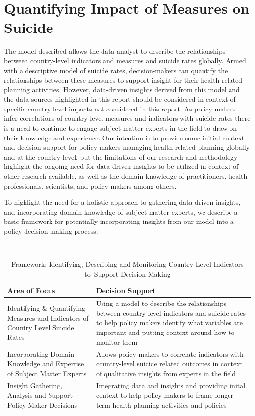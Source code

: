 \documentclass[]{article}
\begin{document}
\section{Quantifying Impact of Measures on
Suicide}\label{quantifying-impact-of-measures-on-suicide}

The model described allows the data analyst to describe the
relationships between country-level indicators and measures and suicide
rates globally. Armed with a descriptive model of suicide rates,
decision-makers can quantify the relationships between these measures to
support insight for their health related planning activities. However,
data-driven insights derived from this model and the data sources
highlighted in this report should be considered in context of specific
country-level impacts not considered in this report. As policy makers
infer correlations of country-level measures and indicators with suicide
rates there is a need to continue to engage subject-matter-experts in
the field to draw on their knowledge and experience. Our intention is to
provide some initial context and decision support for policy makers
managing health related planning globally and at the country level, but
the limitations of our research and methodology highlight the ongoing
need for data-driven insights to be utilized in context of other
research available, as well as the domain knowledge of practitioners,
health professionals, scientists, and policy makers among others.

To highlight the need for a holistic approach to gathering data-driven
insights, and incorporating domain knowledge of subject matter experts,
we describe a basic framework for potentially incorporating insights
from our model into a policy decision-making process:

\begin{table}[H]
\centering 
\caption{Framework: Identifying, Describing and Monitoring Country Level Indicators to Support Decision-Making}
\
\begin{tabular}{p{7cm}p{9cm}}  
\hline  
   Area of Focus  & Decision Support  \\   
\hline 
 Identifying \& Quantifying Measures and Indicators of Country Level Suicide Rates &  Using a model to describe the relationships between country-level indicators and suicide rates to help policy makers identify what variables are important and putting context around how to monitor them \\   
 \hline 
Incorporating Domain Knowledge and Expertise of Subject Matter Experts & Allows policy makers to correlate indicators with country-level suicide related outcomes in context of qualitative insights from experts in the field \\   
\hline 
Insight Gathering, Analysis and Support Policy Maker Decisions & Integrating data and insights and providing inital context to help policy makers to frame longer term health planning activities and policies \\
\hline 
\end{tabular} 
\end{table}
\end{document}

